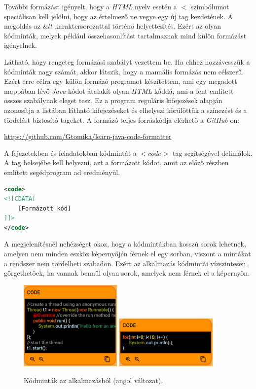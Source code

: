 \documentclass[12pt,a4paper]{article}
\begin{document}
	További formázást igényelt, hogy a \textit{HTML} nyelv esetén a $<$ szimbólumot speciálisan kell jelölni, hogy az értelmező ne vegye egy új tag kezdetének. A megoldás az $\&lt$ karaktersorozattal történő helyettesítés. Ezért az olyan kódminták, melyek például összehasonlítást tartalmaznak mind külön formázást igényelnek.
	
	Látható, hogy rengeteg formázási szabályt vezettem be. Ha ehhez hozzávesszük a kódminták nagy számát, akkor látszik, hogy a manuális formázás nem célszerű. Ezért erre  célra egy külön formázó programot készítettem, ami egy megadott mappában lévő \textit{Java} kódot átalakít olyan \textit{HTML} kóddá, ami a fent említett összes szabálynak eleget tesz. Ez a program reguláris kifejezések alapján azonosítja a listában látható kifejezéseket és elhelyezi körülöttük a színezést és a tördelést biztosító tageket. A formázó teljes forráskódja elérhető a \textit{GitHub}-on:
	
	\begin{center}
		\url{https://github.com/Gtomika/learn-java-code-formatter}
	\end{center}  
	
	A fejezetekben és feladatokban kódmintát a $<code>$ tag segítségével definiálok. A tag belsejébe kell helyezni, azt a formázott kódot, amit az előző részben említett segédprogram ad eredményül.
	
	\bigskip
	\begin{lstlisting}[language=XML]
<code>
<![CDATA[
	[Formázott kód]
]]>
</code>	
	\end{lstlisting}
	\bigskip
	
	A megjelenítésnél nehézséget okoz, hogy a kódmintákban kosszú sorok lehetnek, amelyen nem minden eszköz képernyőjén férnek el egy sorban, viszont a mintákat a rendszer nem tördelheti szabadon. Ezért az alkalmazás kódmintái vízszintesen görgethetőek, ha vannak bennül olyan sorok, amelyek nem férnek el a képernyőn.
	
	\begin{figure}
		\centering
		\includegraphics[width=5cm]{code_component_1}
		\includegraphics[width=5cm]{code_component_2}
		\caption{Kódminták az alkalmazásból (angol változat).}
		\label{code_component_figure}
	\end{figure}
	
\end{document}
